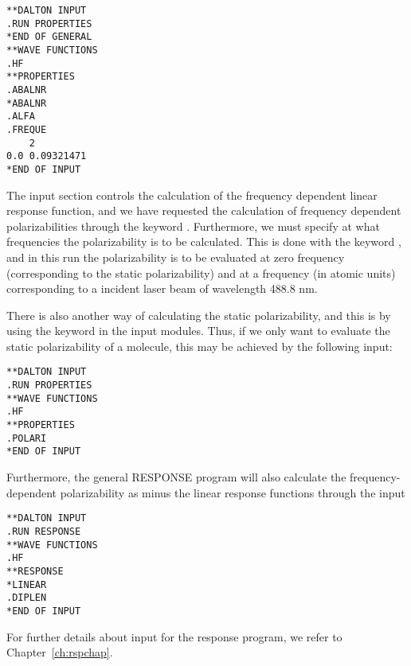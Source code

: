 \begin{verbatim}
**DALTON INPUT
.RUN PROPERTIES
*END OF GENERAL
**WAVE FUNCTIONS
.HF
**PROPERTIES
.ABALNR
*ABALNR
.ALFA
.FREQUE
    2
0.0 0.09321471
*END OF INPUT
\end{verbatim}

The  input section controls the calculation of the
frequency dependent linear response function,
and we have requested
the calculation of frequency dependent
polarizabilities through
the keyword .
Furthermore, we must specify at what frequencies the polarizability is
to be calculated. This is done with the keyword , and in
this run the polarizability is to be evaluated at zero frequency
(corresponding to the static polarizability) and at a frequency (in
atomic units) corresponding to a incident laser beam of wavelength
488.8 nm.

There is also another way of calculating the static
 polarizability, and this is by using the
keyword  in the  input modules. Thus, if we only
want to evaluate the static polarizability of a molecule, this may be
achieved by the following input:

\begin{verbatim}
**DALTON INPUT
.RUN PROPERTIES
**WAVE FUNCTIONS
.HF 
**PROPERTIES
.POLARI
*END OF INPUT
\end{verbatim}

Furthermore, the general RESPONSE program will also calculate the
frequency-dependent polarizability as minus the linear response
functions through the input


\begin{verbatim}
**DALTON INPUT
.RUN RESPONSE
**WAVE FUNCTIONS
.HF
**RESPONSE
*LINEAR
.DIPLEN
*END OF INPUT
\end{verbatim}
For further details about input for the response program, we refer
to Chapter~\ref{ch:rspchap}.
